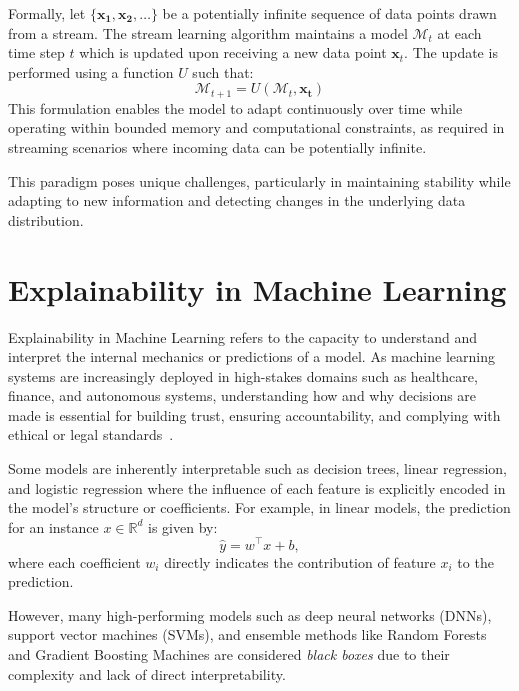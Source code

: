 Formally, let $\{\mathbf{x_1, x_2,\ldots} \} $ be a potentially infinite
sequence of data points drawn from a stream. The stream learning algorithm
maintains a model $\mathcal{M}_t$ at each time step $t$ which is updated upon
receiving a new data point $\mathbf{x}_t$. The update is performed using a
function $U$ such that:
\begin{equation}
    \mathcal{M}_{t+1} = U(\mathcal{M}_t, \mathbf{x_t})
\end{equation}
This formulation enables the model to adapt continuously over time while
operating within bounded memory and computational constraints, as required
in streaming scenarios where incoming data can be potentially infinite.

This paradigm poses unique challenges, particularly in maintaining stability
while adapting to new information and detecting changes in the underlying data
distribution.

\section{Explainability in Machine Learning}\label{sec:explainability}

Explainability in Machine Learning refers to the capacity to understand and
interpret the internal mechanics or predictions of a model. As machine learning
systems are increasingly deployed in high-stakes domains such as healthcare,
finance, and autonomous systems, understanding how and why decisions are made
is essential for building trust, ensuring accountability, and complying with
ethical or legal standards~\cite{importance_of_explainabilty}.

Some models are inherently interpretable such as decision trees, linear
regression, and logistic regression where the influence of each feature is
explicitly encoded in the model's structure or coefficients. For example, in
linear models, the prediction for an instance $x \in \mathbb{R}^d$ is given by:
\begin{equation}
    \hat{y} = w^\top x + b,
\end{equation}
where each coefficient $w_i$ directly indicates the contribution of feature
$x_i$ to the prediction.

However, many high-performing models such as deep neural networks (DNNs),
support vector machines (SVMs), and ensemble methods like Random Forests and
Gradient Boosting Machines are considered \emph{black boxes} due to their
complexity and lack of direct interpretability.

